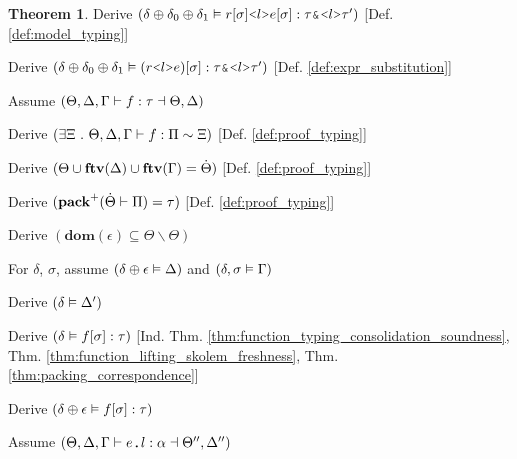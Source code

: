 \documentclass[acmsmall]{acmart}
\theoremstyle{definition}
\newtheorem{theorem}{Theorem}[section]
\begin{document}
\begin{theorem}
  \item \I\I \N Derive $(
    \delta \oplus \delta_0 \oplus \delta_1 \satisfies r[\sigma]\J{<}l\J{>}e[\sigma] \hastype \tau \J{\&} \J{<}l\J{>}\tau'
  )$ [Def. \ref{def:model_typing}]

  \item \I\I \N Derive $(
    \delta \oplus \delta_0 \oplus \delta_1 \satisfies (r\J{<}l\J{>}e)[\sigma] \hastype \tau \J{\&} \J{<}l\J{>}\tau'
  )$ [Def. \ref{def:expr_substitution}]


  \item \N Assume $(
    \Theta, \Delta, \Gamma \vdash f : \tau \dashv \Theta, \Delta
  )$

  \item \I \N Derive $(
    \exists \Xi \ .\  \Theta, \Delta, \Gamma \vdash f : \Pi \sim \Xi
  )$ [Def. \ref{def:proof_typing}]

  \item \I \N Derive $(
    \Theta \cup \textbf{ftv}(\Delta) \cup \textbf{ftv}(\Gamma) = \dot{\Theta}
  )$ [Def. \ref{def:proof_typing}]

  \item \I \N Derive $(
    \textbf{pack}^+(\dot{\Theta} \vdash \Pi) = \tau
  )$ [Def. \ref{def:proof_typing}]

  \item \I \N Derive $(
    \textbf{dom}(\epsilon) \subseteq \Theta \backslash \Theta
  )$

  \item \I \N For $\delta$, $\sigma$,
    assume $(\delta \oplus \epsilon \vDash \Delta)$
    and $(\delta, \sigma \vDash \Gamma)$

  \item \I\I \N Derive $(
    \delta \vDash \Delta'
  )$

  \item \I\I \N Derive $(
    \delta \vDash f[\sigma] : \tau
  )$ [Ind. Thm. \ref{thm:function_typing_consolidation_soundness}, Thm. \ref{thm:function_lifting_skolem_freshness},
      Thm. \ref{thm:packing_correspondence}]

  \item \I\I \N Derive $(
    \delta \oplus \epsilon \vDash f[\sigma] : \tau
  )$ 


  \item \N Assume $(
    \Theta, \Delta, \Gamma \entails e \J{.} l \hastype \alpha \given \Theta'', \Delta''
  )$


\end{theorem}
\end{document}
